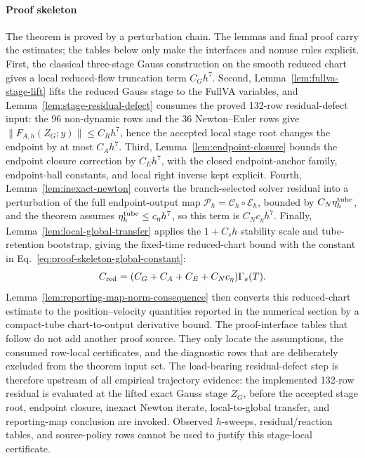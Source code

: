 \documentclass[preprint,12pt]{elsarticle}
\begin{document}
\paragraph{Proof skeleton}
The theorem is proved by a perturbation chain. The lemmas and final proof carry
the estimates; the tables below only make the interfaces and nonuse rules
explicit. First, the classical three-stage Gauss
construction on the smooth
reduced chart gives a local reduced-flow truncation term \(C_Gh^7\). Second,
Lemma~\ref{lem:fullva-stage-lift} lifts the reduced Gauss stage to the
FullVA variables, and Lemma~\ref{lem:stage-residual-defect} consumes the
proved 132-row residual-defect input: the 96 non-dynamic rows and
the 36 Newton--Euler rows give \(\|F_{A,h}(Z_G;y)\|\le C_Rh^7\), hence the
accepted local stage root changes the endpoint by at most \(C_Ah^7\). Third,
Lemma~\ref{lem:endpoint-closure} bounds the endpoint closure correction by
\(C_Eh^7\), with the closed endpoint-anchor family, endpoint-ball constants,
and local right inverse kept explicit. Fourth, Lemma~\ref{lem:inexact-newton} converts the
branch-selected solver residual into a perturbation of the full endpoint-output
map \(\mathcal P_h=\mathcal C_h\circ\mathcal E_h\), bounded by
\(C_N\eta_h^{\rm tube}\), and the theorem assumes
\(\eta_h^{\rm tube}\le c_\eta h^7\), so this term is \(C_Nc_\eta h^7\).
Finally, Lemma~\ref{lem:local-global-transfer} applies the \(1+C_sh\)
stability scale and tube-retention bootstrap, giving the fixed-time
reduced-chart bound with the constant in
Eq.~\eqref{eq:proof-skeleton-global-constant}:
\begin{equation}
\label{eq:proof-skeleton-global-constant}
  C_{\rm red}=(C_G+C_A+C_E+C_Nc_\eta)\Gamma_s(T).
\end{equation}
Lemma~\ref{lem:reporting-map-norm-consequence} then converts this
reduced-chart estimate to the position--velocity quantities reported in the
numerical section by a compact-tube chart-to-output derivative bound. The
proof-interface tables that follow do not add another proof source.  They
only locate the assumptions, the consumed row-local certificates, and the
diagnostic rows that are deliberately excluded from the theorem input set.
The load-bearing residual-defect step is therefore upstream of all empirical
trajectory evidence: the implemented 132-row residual is evaluated at the
lifted exact Gauss stage \(Z_G\), before the accepted stage root, endpoint
closure, inexact Newton iterate, local-to-global transfer, and reporting-map
conclusion are invoked. Observed \(h\)-sweeps, residual/reaction tables, and
source-policy rows cannot be used to justify this stage-local certificate.
\end{document}
